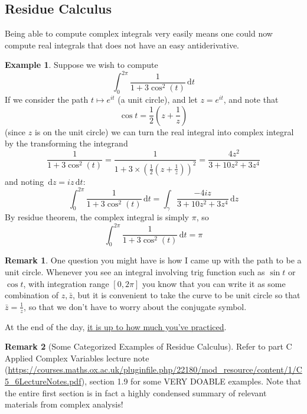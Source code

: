 \documentclass[a4paper, 12pt]{article}
\theoremstyle{definition}
\newtheorem{example}{Example}
\newtheorem{remark}{Remark}
\numberwithin{theorem}{section}
\numberwithin{definition}{section}
\numberwithin{exercise}{section}
\numberwithin{remark}{section}
\numberwithin{figure}{section}
\numberwithin{example}{section}
\newcommand{\intd}{\,\text{d}}
\begin{document}
\subsection{Residue Calculus}
Being able to compute complex integrals very easily means one could now compute real integrals that does not have an easy antiderivative.
\begin{example}
    Suppose we wish to compute
    \begin{equation*}
        \int_{0}^{2\pi} \frac{1}{1+3 \cos^2 (t)} \intd t
    \end{equation*}
    If we consider the path $t \mapsto e^{it}$ (a unit circle),
    and let $z = e^{it}$, and note that
    \begin{equation*}
        \cos{t} = \frac{1}{2} \left( z + \frac{1}{z} \right)
    \end{equation*}
    (since $z$ is on the unit circle)
    we can turn the real integral into complex integral by the transforming the integrand
    \begin{equation*}
        \frac{1}{1+3 \cos^2 (t)} = \frac{1}{1+3 \times \left( \frac{1}{2}\left( z+\frac{1}{z} \right) \right)^2} = \frac{4z^2}{3 + 10z^2 + 3z^4}
    \end{equation*}
    and noting $\intd z = iz \intd t$:
    \begin{equation*}
        \int_{0}^{2\pi} \frac{1}{1+3 \cos^2 (t)} \intd t = \int_\gamma \frac{-4iz}{3+10z^2 + 3z^4} \intd z
    \end{equation*}
    By residue theorem, the complex integral is simply $\pi$, so
    \begin{equation*}
        \int_{0}^{2\pi} \frac{1}{1+3 \cos^2 (t)} \intd t  = \pi
    \end{equation*}
\end{example}
\begin{remark}
    One question you might have is how I came up with the path to be a unit circle.
    Whenever you see an integral involving trig function such as $\sin t$ or $\cos t$, with integration range $\left[ 0,2\pi \right]$ you know that you can write it as some combination of $z, \bar z$, but it is convenient to take the curve to be unit circle so that $\bar z = \frac{1}{z}$, so that we don't have to worry about the conjugate symbol.

    At the end of the day, \ul{it is up to how much you've practiced}.
\end{remark}
\begin{remark}[Some Categorized Examples of Residue Calculus]
    Refer to part C Applied Complex Variables lecture note (\url{https://courses.maths.ox.ac.uk/pluginfile.php/22180/mod_resource/content/1/C5_6LectureNotes.pdf}),
    section 1.9 for some VERY DOABLE examples.
    Note that the entire first section is in fact a highly condensed summary of relevant materials from complex analysis!
\end{remark}
\end{document}
